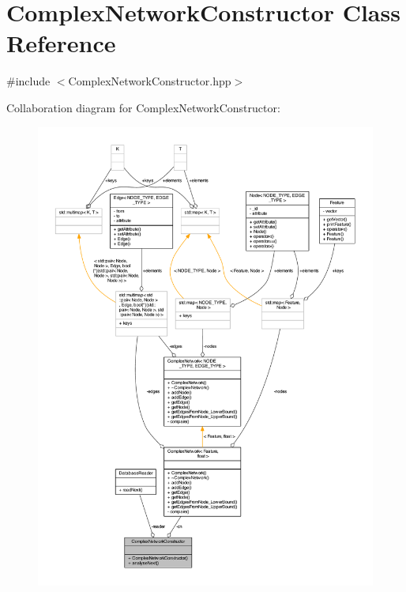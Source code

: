 \hypertarget{class_complex_network_constructor}{\section{Complex\+Network\+Constructor Class Reference}
\label{class_complex_network_constructor}
}


{\ttfamily \#include $<$Complex\+Network\+Constructor.\+hpp$>$}



Collaboration diagram for Complex\+Network\+Constructor\+:
\nopagebreak
\begin{figure}[H]
\begin{center}
\leavevmode
\includegraphics[width=350pt]{class_complex_network_constructor__coll__graph}
\end{center}
\end{figure}
